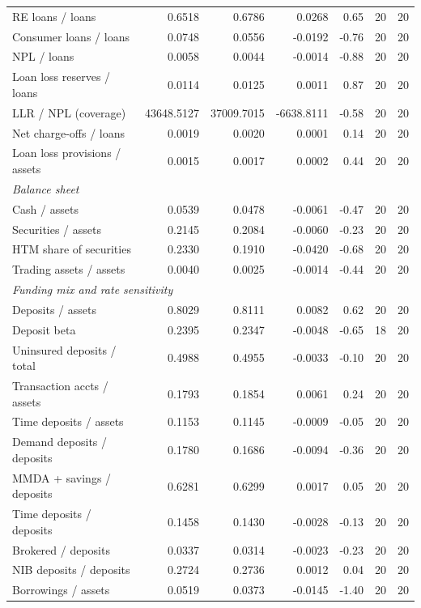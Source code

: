 \begin{tabular}{lrrrrrr}
RE loans / loans & 0.6518 & 0.6786 & 0.0268 & 0.65 & 20 & 20 \\
Consumer loans / loans & 0.0748 & 0.0556 & -0.0192 & -0.76 & 20 & 20 \\
NPL / loans & 0.0058 & 0.0044 & -0.0014 & -0.88 & 20 & 20 \\
Loan loss reserves / loans & 0.0114 & 0.0125 & 0.0011 & 0.87 & 20 & 20 \\
LLR / NPL (coverage) & 43648.5127 & 37009.7015 & -6638.8111 & -0.58 & 20 & 20 \\
Net charge-offs / loans & 0.0019 & 0.0020 & 0.0001 & 0.14 & 20 & 20 \\
Loan loss provisions / assets & 0.0015 & 0.0017 & 0.0002 & 0.44 & 20 & 20 \\
\midrule
\multicolumn{7}{l}{\emph{Balance sheet}} \\
\midrule
Cash / assets & 0.0539 & 0.0478 & -0.0061 & -0.47 & 20 & 20 \\
Securities / assets & 0.2145 & 0.2084 & -0.0060 & -0.23 & 20 & 20 \\
HTM share of securities & 0.2330 & 0.1910 & -0.0420 & -0.68 & 20 & 20 \\
Trading assets / assets & 0.0040 & 0.0025 & -0.0014 & -0.44 & 20 & 20 \\
\midrule
\multicolumn{7}{l}{\emph{Funding mix and rate sensitivity}} \\
\midrule
Deposits / assets & 0.8029 & 0.8111 & 0.0082 & 0.62 & 20 & 20 \\
Deposit beta & 0.2395 & 0.2347 & -0.0048 & -0.65 & 18 & 20 \\
Uninsured deposits / total & 0.4988 & 0.4955 & -0.0033 & -0.10 & 20 & 20 \\
Transaction accts / assets & 0.1793 & 0.1854 & 0.0061 & 0.24 & 20 & 20 \\
Time deposits / assets & 0.1153 & 0.1145 & -0.0009 & -0.05 & 20 & 20 \\
Demand deposits / deposits & 0.1780 & 0.1686 & -0.0094 & -0.36 & 20 & 20 \\
MMDA + savings / deposits & 0.6281 & 0.6299 & 0.0017 & 0.05 & 20 & 20 \\
Time deposits / deposits & 0.1458 & 0.1430 & -0.0028 & -0.13 & 20 & 20 \\
Brokered / deposits & 0.0337 & 0.0314 & -0.0023 & -0.23 & 20 & 20 \\
NIB deposits / deposits & 0.2724 & 0.2736 & 0.0012 & 0.04 & 20 & 20 \\
Borrowings / assets & 0.0519 & 0.0373 & -0.0145 & -1.40 & 20 & 20 \\

\end{tabular}
